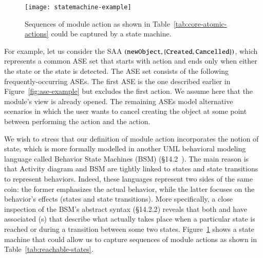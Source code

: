 \begin{figure}[ht]
	\centering
	\texttt{[image: statemachine-example]}
	\caption{Sequences of module action as shown in Table~\ref{tab:core-atomic-actions} could be captured by a state machine.} %
	\label{fig:statemachine-example}
\end{figure}
 
For example, let us consider the SAA $ ({\tt newObject}, \{ {\tt Created},{\tt Cancelled} \}) $, which represents a common ASE set that starts with action  and ends only when either the state  or the state  is detected. The ASE set consists of the following frequently-occurring ASEs. The 
first ASE is the one described earlier in Figure~\ref{fig:ase-example} but excludes the first action. We assume here that the module's view is already opened. The remaining ASEs model alternative scenarios in which the user wants to cancel creating the object at some point between performing the  action and the  action.
%

 We wish to stress that our definition of module action incorporates the notion of state, which is more formally modelled in another UML behavioral modeling language called Behavior State Machines (BSM) (\S{14.2}~\cite{omg_unified_2015}). The main reason is that Activity diagram and BSM are tightly linked to states and state transitions to represent behaviors. Indeed, these languages represent two sides of the same coin: the former emphasizes the actual behavior, while the latter focuses on the behavior's effects (states and state transitions). More specifically, a close inspection of the BSM's abstract syntax (\S{14.2.2}) reveals that both  and  have associated (s) that describe what actually takes place when a particular state is reached or during a transition between some two states. Figure~\ref{fig:statemachine-example} shows a state machine that could allow us to capture sequences of module actions as shown in Table~\ref{tab:reachable-states}.



